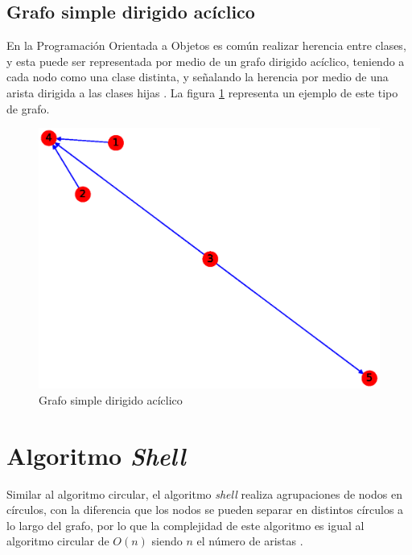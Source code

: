 \documentclass{article}
\begin{document}
\subsection{Grafo simple dirigido acíclico}
En la Programación Orientada a Objetos es común realizar herencia entre clases, y esta puede ser representada por medio de un grafo dirigido acíclico, teniendo a cada nodo como una clase distinta, y señalando la herencia por medio de una arista dirigida a las clases hijas \cite{GSDA}. La figura \ref{fig:GSDA} representa un ejemplo de este tipo de grafo.
\begin{figure}[H]
    \includegraphics[width=\textwidth]{4-GSDA}
    \caption{Grafo simple dirigido acíclico}
    \label{fig:GSDA}
\end{figure}


\section{Algoritmo \textit{Shell}}
Similar al algoritmo circular, el algoritmo \textit{shell} realiza agrupaciones de nodos en círculos, con la diferencia que los nodos se pueden separar en distintos círculos a lo largo del grafo, por lo que la complejidad de este algoritmo es igual al algoritmo circular de $O(n)$ siendo $n$ el número de aristas \cite{shell}.
\end{document}
